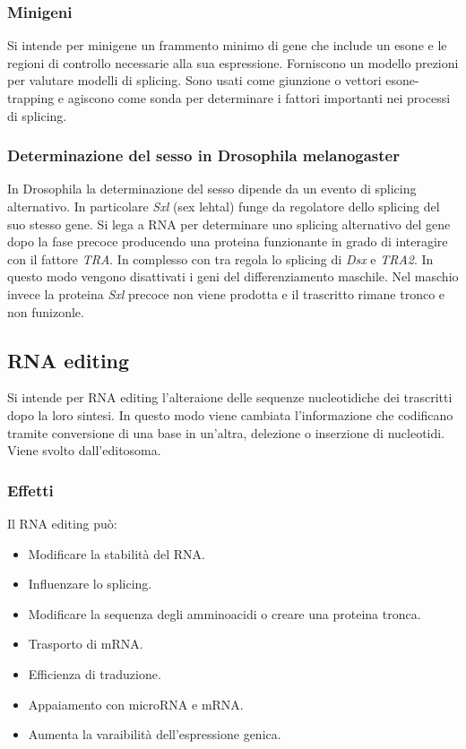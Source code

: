 		\subsubsection{Minigeni}
		Si intende per minigene un frammento minimo di gene che include un esone e le regioni di controllo necessarie alla sua espressione.
		Forniscono un modello prezioni per valutare modelli di splicing.
		Sono usati come giunzione o vettori esone-trapping e agiscono come sonda per determinare i fattori importanti nei processi di splicing.

		\subsubsection{Determinazione del sesso in Drosophila melanogaster}
		In Drosophila la determinazione del sesso dipende da un evento di splicing alternativo.
		In particolare \emph{Sxl} (sex lehtal) funge da regolatore dello splicing del suo stesso gene.
		Si lega a RNA per determinare uno splicing alternativo del gene dopo la fase precoce producendo una proteina funzionante in grado di interagire con il fattore \emph{TRA}.
		In complesso con tra regola lo splicing di \emph{Dsx} e \emph{TRA2}.
		In questo modo vengono disattivati i geni del differenziamento maschile.
		Nel maschio invece la proteina \emph{Sxl} precoce non viene prodotta e il trascritto rimane tronco e non funizonle.

	\subsection{RNA editing}
	Si intende per RNA editing l'alteraione delle sequenze nucleotidiche dei trascritti dopo la loro sintesi.
	In questo modo viene cambiata l'informazione che codificano tramite conversione di una base in un'altra, delezione o inserzione di nucleotidi.
	Viene svolto dall'editosoma.
	
		\subsubsection{Effetti}
		Il RNA editing pu\`o:
		\begin{multicols}{2}
			\begin{itemize}
				\item Modificare la stabilit\`a del RNA.
				\item Influenzare lo splicing.
				\item Modificare la sequenza degli amminoacidi o creare una proteina tronca.
				\item Trasporto di mRNA.
				\item Efficienza di traduzione.
				\item Appaiamento con microRNA e mRNA.
				\item Aumenta la varaibilit\`a dell'espressione genica.
			\end{itemize}
		\end{multicols}

